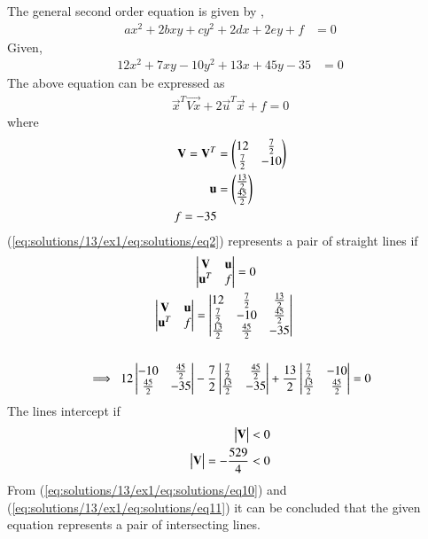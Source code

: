 The general second order equation is given by ,
\begin{align}
ax^2+2bxy+cy^2+2dx+2ey+f&=0\label{eq:solutions/13/ex1/eq1}
\end{align}
Given,
\begin{align}
    12x^2+7xy-10y^2+13x+45y-35&=0 \label{eq:solutions/13/ex1/eqgiven}
\end{align}
The above equation can be expressed as
\begin{align}
        \vec{x}^{T}\vec{Vx} + 2\vec{u}^{T}\vec{x} + f=0   \label{eq:solutions/13/ex1/eq:solutions/eq2}
\end{align}
where
\begin{align}
	\mathbf{V}=\mathbf{V}^T &= \begin{pmatrix}12 & \frac{7}{2} \\ \frac{7}{2} & -10\end{pmatrix} \\
	\mathbf{u} &= \begin{pmatrix}\frac{13}{2} \\ \frac{45}{2}\end{pmatrix} \\
	 f=-35
\end{align}	
	(\ref{eq:solutions/13/ex1/eq:solutions/eq2}) represents a pair of straight lines if
\begin{align}
	&\begin{vmatrix}\mathbf{V} & \mathbf{u} \\ \mathbf{u}^T & f\end{vmatrix} = 0     \label{eq:solutions/13/ex1/eq:solutions/eq5} \\
	\begin{vmatrix}\mathbf{V} & \mathbf{u} \\ \mathbf{u}^T & f\end{vmatrix} 
		&= \begin{vmatrix}12 & \frac{7}{2}  & \frac{13}{2} \\ 
	        \frac{7}{2} & -10 & \frac{45}{2}     \\
	       \frac{13}{2} & \frac{45}{2} & -35 \end{vmatrix}  \\
	       		\nonumber \\
	\implies \ 12\begin{vmatrix}-10 & \frac{45}{2} \\ \frac{45}{2} & -35\end{vmatrix} 
		& -\frac{7}{2}\begin{vmatrix}\frac{7}{2} & \frac{45}{2} \\ \frac{13}{2} & -35\end{vmatrix} 
		+\frac{13}{2}\begin{vmatrix}\frac{7}{2} & -10 \\ \frac{13}{2} & \frac{45}{2}\end{vmatrix} = 0 \label{eq:solutions/13/ex1/eq:solutions/eq10}
\end{align}
The lines intercept if
\begin{align}
        \begin{vmatrix}\mathbf{V}\end{vmatrix} < 0 \\
 	\begin{vmatrix}\mathbf{V}\end{vmatrix}=-\frac{529}{4} < 0 \label{eq:solutions/13/ex1/eq:solutions/eq11}
\end{align}
\renewcommand{\thefigure}{1}
From (\ref{eq:solutions/13/ex1/eq:solutions/eq10}) and (\ref{eq:solutions/13/ex1/eq:solutions/eq11}) it can be concluded that the given equation represents a pair of intersecting lines.\\
